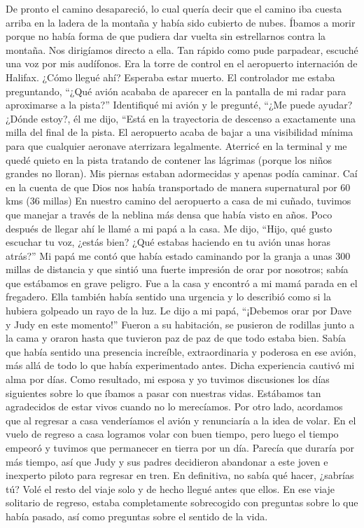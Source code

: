 \documentclass[twoside, 12pt]{book}
\begin{document}
De pronto el camino desapareció, lo cual quería decir que el camino iba cuesta arriba en la ladera de la montaña y había sido cubierto de nubes. Íbamos a morir porque no había forma de que pudiera dar vuelta sin estrellarnos contra la montaña. Nos dirigíamos directo a ella. Tan rápido como pude parpadear, escuché una voz por mis audífonos. Era la torre de control en el aeropuerto internación de Halifax. ¿Cómo llegué ahí? Esperaba estar muerto. El controlador me estaba preguntando, “¿Qué avión acababa de aparecer en la pantalla de mi radar para aproximarse a la pista?” Identifiqué mi avión y le pregunté, “¿Me puede ayudar? ¿Dónde estoy?, él me dijo, “Está en la trayectoria de descenso a exactamente una milla del final de la pista. El aeropuerto acaba de bajar a una visibilidad mínima para que cualquier aeronave aterrizara legalmente. Aterricé en la terminal y me quedé quieto en la pista tratando de contener las lágrimas (porque los niños grandes no lloran). Mis piernas estaban adormecidas y apenas podía caminar. Caí en la cuenta de que Dios nos había transportado de manera supernatural por 60 kms (36 millas)
En nuestro camino del aeropuerto a casa de mi cuñado, tuvimos que manejar a través de la neblina más densa que había visto en años. Poco después de llegar ahí le llamé a mi papá a la casa. Me dijo, “Hijo, qué gusto escuchar tu voz, ¿estás bien? ¿Qué estabas haciendo en tu avión unas horas atrás?” Mi papá me contó que había estado caminando por la granja a unas 300 millas de distancia y que sintió una fuerte impresión de orar por nosotros; sabía que estábamos en grave peligro. Fue a la casa y encontró a mi mamá parada en el fregadero. Ella también había sentido una urgencia y lo describió como si la hubiera golpeado un rayo de la luz. Le dijo a mi papá, “¡Debemos orar por Dave y Judy en este momento!” Fueron a su habitación, se pusieron de rodillas junto a la cama y oraron hasta que tuvieron paz de paz de que todo estaba bien.
Sabía que había sentido una presencia increíble, extraordinaria y poderosa en ese avión, más allá de todo lo que había experimentado antes. Dicha experiencia cautivó mi alma por días. Como resultado, mi esposa y yo tuvimos discusiones los días siguientes sobre lo que íbamos a pasar con nuestras vidas. Estábamos tan agradecidos de estar vivos cuando no lo merecíamos. Por otro lado, acordamos que al regresar a casa venderíamos el avión y renunciaría a la idea de volar. En el vuelo de regreso a casa logramos volar con buen tiempo, pero luego el tiempo empeoró y tuvimos que permanecer en tierra por un día. Parecía que duraría por más tiempo, así que Judy y sus padres decidieron abandonar a este joven e inexperto piloto para regresar en tren. En definitiva, no sabía qué hacer, ¿sabrías tú? Volé el resto del viaje solo y de hecho llegué antes que ellos. En ese viaje solitario de regreso, estaba completamente sobrecogido con preguntas sobre lo que había pasado, así como preguntas sobre el sentido de la vida.\\
  
\end{document}
